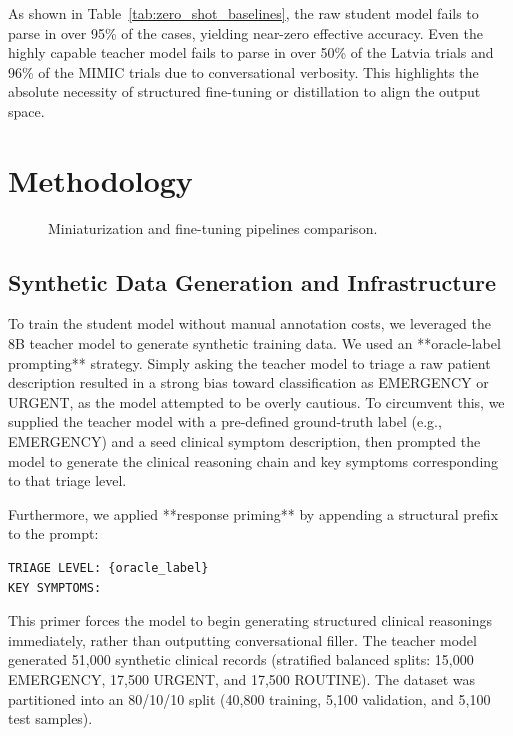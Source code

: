 \documentclass[a4paper, 12pt]{article}
\begin{document}
As shown in Table~\ref{tab:zero_shot_baselines}, the raw student model fails to parse in over 95\% of the cases, yielding near-zero effective accuracy. Even the highly capable teacher model fails to parse in over 50\% of the Latvia trials and 96\% of the MIMIC trials due to conversational verbosity. This highlights the absolute necessity of structured fine-tuning or distillation to align the output space.

\section{Methodology}
\label{sec:methodology}

\begin{figure}[h]
\centering
{}
\caption{Miniaturization and fine-tuning pipelines comparison.}
\label{fig:pipeline}
\end{figure}

\subsection{Synthetic Data Generation and Infrastructure}
To train the student model without manual annotation costs, we leveraged the 8B teacher model to generate synthetic training data. We used an **oracle-label prompting** strategy. Simply asking the teacher model to triage a raw patient description resulted in a strong bias toward classification as EMERGENCY or URGENT, as the model attempted to be overly cautious. To circumvent this, we supplied the teacher model with a pre-defined ground-truth label (e.g., EMERGENCY) and a seed clinical symptom description, then prompted the model to generate the clinical reasoning chain and key symptoms corresponding to that triage level.

Furthermore, we applied **response priming** by appending a structural prefix to the prompt:
\begin{verbatim}
TRIAGE LEVEL: {oracle_label}
KEY SYMPTOMS:
\end{verbatim}
This primer forces the model to begin generating structured clinical reasonings immediately, rather than outputting conversational filler. The teacher model generated 51,000 synthetic clinical records (stratified balanced splits: 15,000 EMERGENCY, 17,500 URGENT, and 17,500 ROUTINE). The dataset was partitioned into an 80/10/10 split (40,800 training, 5,100 validation, and 5,100 test samples).
\end{document}
